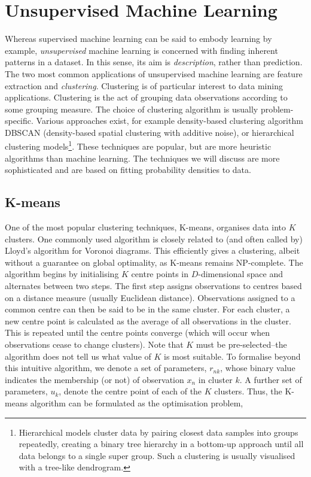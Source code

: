 \documentclass[11pt]{amsart}
\begin{document}
\section{Unsupervised Machine Learning}

Whereas supervised machine learning can be said to embody learning by example, \emph{unsupervised} machine learning is concerned with finding inherent patterns in a dataset. In this sense, its aim is \emph{description}, rather than prediction. The two most common applications of unsupervised machine learning are feature extraction and \emph{clustering}. Clustering is of particular interest to data mining applications. Clustering is the act of grouping data observations according to some grouping measure. The choice of clustering algorithm is usually problem-specific. Various approaches exist, for example density-based clustering algorithm DBSCAN (density-based spatial clustering with additive noise), or hierarchical clustering models\footnote{Hierarchical models cluster data by pairing closest data samples into groups repeatedly, creating a binary tree hierarchy in a bottom-up approach until all data belongs to a single super group. Such a clustering is usually visualised with a tree-like dendrogram.}. These techniques are popular, but are more heuristic algorithms than machine learning. The techniques we will discuss are more sophisticated and are based on fitting probability densities to data.

\subsection{K-means}

One of the most popular clustering techniques, K-means, organises data into $K$ clusters. One commonly used algorithm is closely related to (and often called by) Lloyd's algorithm for Voronoi diagrams. This efficiently gives a clustering, albeit without a guarantee on global optimality, as K-means remains NP-complete. The algorithm begins by initialising $K$ centre points in $D$-dimensional space and alternates between two steps. The first step assigns observations to centres based on a distance measure (usually Euclidean distance). Observations assigned to a common centre can then be said to be in the same cluster. For each cluster, a new centre point is calculated as the average of all observations in the cluster. This is repeated until the centre points converge (which will occur when observations cease to change clusters). Note that $K$ must be pre-selected--the algorithm does not tell us what value of $K$ is most suitable. To formalise beyond this intuitive algorithm, we denote a set of parameters, $r_{nk}$, whose binary value indicates the membership (or not) of observation $x_n$ in cluster $k$. A further set of parameters, $u_k$, denote the centre point of each of the $K$ clusters. Thus, the K-means algorithm can be formulated as the optimisation problem,
\end{document}
